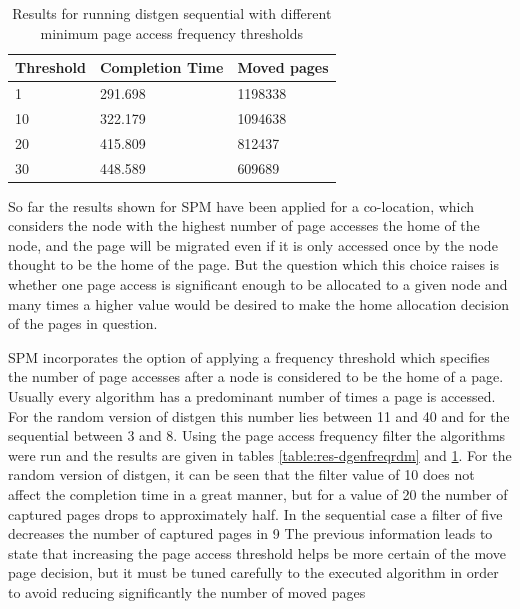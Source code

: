 \begin{table}
	\centering
		\begin{tabularx}{.7\textwidth}{|l|l|X|}
		\hline
			Threshold & Completion Time & Moved pages  \\
			\hline
			1 & 291.698 & 1198338 \\
			\hline
			10 & 322.179 & 1094638 \\
			\hline
			20 & 415.809 & 812437 \\
			\hline
			30 & 448.589 & 609689 \\
			\hline
		\end{tabularx}
		\caption{Results for running distgen sequential with different minimum page access frequency thresholds}
		\label{table:res-dgenfreqseq}
\end{table}

So far the results shown for SPM have been applied for a co-location, which considers the node with the highest number of page accesses the home of the node, and the page will be migrated even if it is only accessed once by the node thought to be the home of the page. But the question which this choice raises is whether one page access is significant enough to be allocated to a given node and many times a higher value would be desired to make the home allocation decision of the pages in question. 

SPM incorporates the option of applying a frequency threshold which specifies the number of page accesses after a node is considered to be the home of a page. Usually every algorithm has a predominant number of times a page is accessed. For the random version of distgen this number lies between 11 and 40 and for the sequential between 3 and 8. Using the page access frequency filter the algorithms were run and the results are given in tables \ref{table:res-dgenfreqrdm} and \ref{table:res-dgenfreqseq}. For the random version of distgen, it can be seen that the filter value of 10 does not affect the completion time in a great manner, but for a value of 20 the number of captured pages drops to approximately half. In the sequential case a filter of five decreases the number of captured pages in 9%
The previous information leads to state that increasing the page access threshold helps be more certain of the move page decision, but it must be tuned carefully to the executed algorithm in order to avoid reducing significantly the number of moved pages

